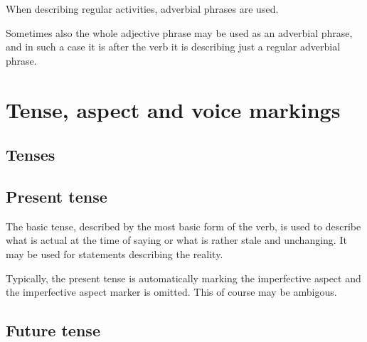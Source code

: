 When describing regular activities, adverbial phrases are used.



Sometimes also the whole adjective phrase may be used as an adverbial phrase,
and in such a case it is after the verb it is describing just a regular
adverbial phrase.


\section{Tense, aspect and voice markings}
\label{sec:markers}

\subsection{Tenses}

\subsection{Present tense}

The basic tense, described by the most basic form of the verb, is used to
describe what is actual at the time of saying or what is rather stale and
unchanging. It may be used for statements describing the reality.

Typically, the present tense is automatically marking the imperfective aspect
and the imperfective aspect marker is omitted. This of course may be ambigous.





\subsection{Future tense}

